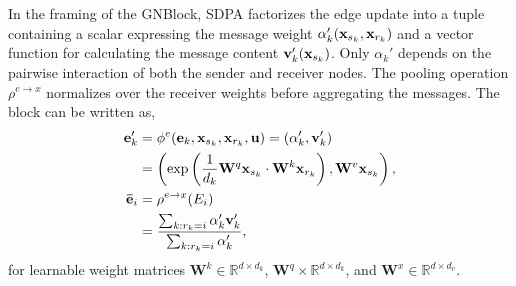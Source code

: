 In the framing of the \Gls{GNBlock}, \Gls{SDPA} factorizes the edge update into a tuple containing a scalar expressing the message weight $\alpha_k'(\mathbf{x}_{s_k}, \mathbf{x}_{r_k})$ and a vector function for calculating the message content $\mathbf{v}_k'(\mathbf{x}_{s_k})$.
Only $\alpha_k'$ depends on the pairwise interaction of both the sender and receiver nodes.
The pooling operation $\rho^{e \to x}$ normalizes over the receiver weights before aggregating the messages.
The block can be written as,
\begin{equation}
    \begin{aligned}
        \mathbf{e}_k'             & = \phi^e(\mathbf{e}_k, \mathbf{x}_{s_k}, \mathbf{x}_{r_k}, \mathbf{u})
        = ( \alpha_k', \mathbf{v}_k' )                                                                                                                      \\
                             & = \left( \exp \left( \frac{1}{d_k} \mathbf{W}^q \mathbf{x}_{s_k} \cdot \mathbf{W}^k \mathbf{x}_{r_k} \right), \mathbf{W}^v \mathbf{x}_{s_k} \right), \\
        \mathbf{\bar{\mathbf{e}}}_i & = \rho^{e \to x}(E_i)                                                                                                        \\
                             & = \frac{\sum_{k: r_k = i} \alpha_k' \mathbf{v}_k'}{\sum_{k: r_k = i} \alpha_k'},
    \end{aligned}
\end{equation}
for learnable weight matrices $\mathbf{W}^k \in \mathbb{R}^{d \times d_k}$, $\mathbf{W}^q \times \mathbb{R}^{d \times d_k}$, and $\mathbf{W}^x \in \mathbb{R}^{d \times d_v}$.

